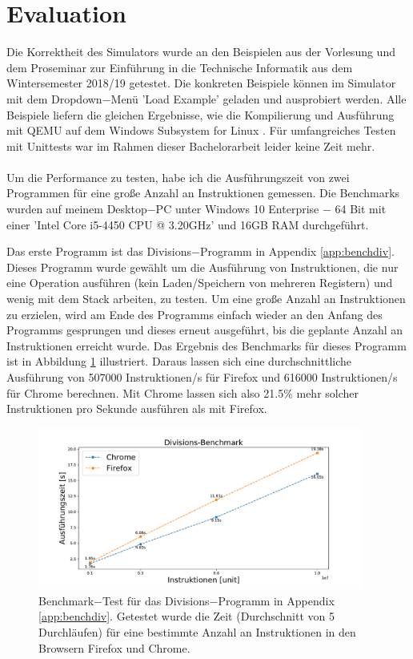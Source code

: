 \documentclass[a4paper, 11pt, onecolumn]{article}
\begin{document}
\newpage
\section{Evaluation}\label{sec:eval}

Die Korrektheit des Simulators wurde an den Beispielen aus der Vorlesung und dem Proseminar zur Einführung in die Technische Informatik aus dem Wintersemester 2018/19 getestet. Die konkreten Beispiele können im Simulator mit dem Dropdown$-$Menü 'Load Example' geladen und ausprobiert werden. Alle Beispiele liefern die gleichen Ergebnisse, wie die Kompilierung und Ausführung mit QEMU \cite{qemu} auf dem Windows Subsystem for Linux \cite{wsl}. Für umfangreiches Testen mit Unittests war im Rahmen dieser Bachelorarbeit leider keine Zeit mehr.\\ \\
Um die Performance zu testen, habe ich die Ausführungszeit von zwei Programmen für eine große Anzahl an Instruktionen gemessen. Die Benchmarks wurden auf meinem Desktop$-$PC unter Windows 10 Enterprise $-$ 64 Bit mit einer 'Intel Core i5-4450 CPU @ 3.20GHz' und 16GB RAM durchgeführt.

Das erste Programm ist das Divisions$-$Programm in Appendix \ref{app:benchdiv}. Dieses Programm wurde gewählt um die Ausführung von Instruktionen, die nur eine Operation ausführen (kein Laden/Speichern von mehreren Registern) und wenig mit dem Stack arbeiten, zu testen. Um eine große Anzahl an Instruktionen zu erzielen, wird am Ende des Programms einfach wieder an den Anfang des Programms gesprungen und dieses erneut ausgeführt, bis die geplante Anzahl an Instruktionen erreicht wurde. Das Ergebnis des Benchmarks für dieses Programm ist in Abbildung \ref{fig:benchmarkDiv} illustriert. Daraus lassen sich eine durchschnittliche Ausführung von 507000 Instruktionen/s für Firefox und 616000 Instruktionen/s für Chrome berechnen. Mit Chrome lassen sich also 21.5\% mehr solcher Instruktionen pro Sekunde ausführen als mit Firefox.

\begin{figure}[!htb]
    \centering  
    \includegraphics[width=0.95\textwidth]{data/divisionBenchmark}
    \caption[Benchmark für Divisions$-$Programm]{Benchmark$-$Test für das Divisions$-$Programm in Appendix \ref{app:benchdiv}. Getestet wurde die Zeit (Durchschnitt von 5 Durchläufen) für eine bestimmte Anzahl an Instruktionen in den Browsern Firefox und Chrome.}
    \label{fig:benchmarkDiv}
\end{figure}
\end{document}
